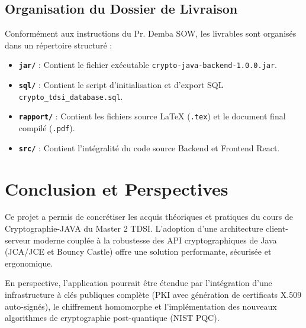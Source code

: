 \documentclass[12pt,a4paper]{report}
\begin{document}
\section{Organisation du Dossier de Livraison}
Conformément aux instructions du Pr. Demba SOW, les livrables sont organisés dans un répertoire structuré :
\begin{tcolorbox}[colback=gray!5,colframe=blue!70!black,title=Structure du Dossier de Remise (Prenom-Nom)]
\begin{itemize}
    \item \textbf{\texttt{jar/}} : Contient le fichier exécutable \texttt{crypto-java-backend-1.0.0.jar}.
    \item \textbf{\texttt{sql/}} : Contient le script d'initialisation et d'export SQL \texttt{crypto\_tdsi\_database.sql}.
    \item \textbf{\texttt{rapport/}} : Contient les fichiers source LaTeX (\texttt{.tex}) et le document final compilé (\texttt{.pdf}).
    \item \textbf{\texttt{src/}} : Contient l'intégralité du code source Backend et Frontend React.
\end{itemize}
\end{tcolorbox}

\newpage

\chapter{Conclusion et Perspectives}

Ce projet a permis de concrétiser les acquis théoriques et pratiques du cours de Cryptographie-JAVA du Master 2 TDSI. L'adoption d'une architecture client-serveur moderne couplée à la robustesse des API cryptographiques de Java (JCA/JCE et Bouncy Castle) offre une solution performante, sécurisée et ergonomique.

En perspective, l'application pourrait être étendue par l'intégration d'une infrastructure à clés publiques complète (PKI avec génération de certificats X.509 auto-signés), le chiffrement homomorphe et l'implémentation des nouveaux algorithmes de cryptographie post-quantique (NIST PQC).
\end{document}
